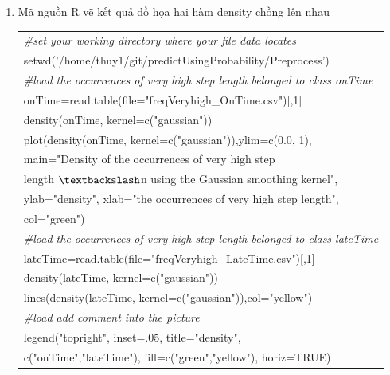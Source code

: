 \documentclass[a4paper, 13pt]{report}
\begin{document}
\begin{enumerate}[label=\textbf{PL\arabic*}]
\item \label{densityOverlap} Mã nguồn R vẽ kết quả đồ họa hai hàm density chồng lên nhau
\begin{flushleft}
\begin{tabular}{  |l| }
\hline 
\textit{\#set your working directory where your file data locates}\\
setwd('/home/thuy1/git/predictUsingProbability/Preprocess')\\
\textit{\#load the occurrences of very high step length belonged to class onTime}\\
onTime=read.table(file="freqVeryhigh\_OnTime.csv")[,1]\\
density(onTime, kernel=c("gaussian"))\\
plot(density(onTime, kernel=c("gaussian")),ylim=c(0.0, 1),\\
\hspace{.5cm} main="Density of the occurrences of very high step\\
\hspace{1.7cm} length $\textbackslash$n using the Gaussian smoothing kernel",\\
\hspace{.5cm}     ylab="density", xlab="the occurrences of very high step length",\\
\hspace{.5cm}     col="green")\\
\textit{\#load the occurrences of very high step length belonged to class lateTime}\\
lateTime=read.table(file="freqVeryhigh\_LateTime.csv")[,1]\\
density(lateTime, kernel=c("gaussian"))\\
lines(density(lateTime, kernel=c("gaussian")),col="yellow")\\
\textit{\#load add comment into the picture}\\
legend("topright", inset=.05, title="density",\\
\hspace{.7cm} c("onTime","lateTime"), fill=c("green","yellow"), horiz=TRUE)\\
\hline
\end{tabular}
\end{flushleft}


\end{enumerate}
\end{document}
